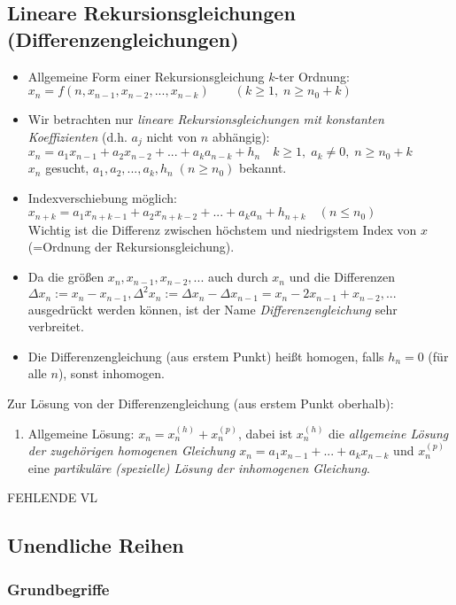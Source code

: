 \subsection{Lineare Rekursionsgleichungen (Differenzengleichungen)}
\begin{itemize}
\item Allgemeine Form einer Rekursionsgleichung $k$-ter Ordnung:\\
$x_n=f(n,x_{n-1},x_{n-2},...,x_{n-k}) \qquad (k \geq 1,\; n\geq n_0+k)$
\item Wir betrachten nur \emph{lineare Rekursionsgleichungen mit konstanten Koeffizienten} (d.h. $a_j$ nicht von $n$ abhängig):\\
$\boxed{x_n=a_1 x_{n-1}+a_2 x_{n-2}+...+a_k a_{n-k}+h_n}\quad k\geq 1, \; a_k \not = 0, \; n\geq n_0 +k$\\
$x_n$ gesucht, $a_1,a_2,...,a_k, h_n \; (n\geq n_0)$ bekannt.
\item Indexverschiebung möglich:\\
$\boxed{x_{n+k}=a_1 x_{n+k-1}+a_2 x_{n+k-2}+...+a_k a_{n}+h_{n+k}}\quad (n\leq n_0)$\\
Wichtig ist die Differenz zwischen höchstem und niedrigstem Index von $x$ (=Ordnung der Rekursionsgleichung).
\item Da die größen $x_n, x_{n-1}, x_{n-2},...$ auch durch $x_n$ und die Differenzen $\Delta x_n:=x_n-x_{n-1}, \Delta^2x_n:=\Delta x_n-\Delta x_{n-1}=x_n-2x_{n-1}+x_{n-2}, ...$ ausgedrückt werden können, ist der Name \emph{Differenzengleichung} sehr verbreitet.
\item Die Differenzengleichung (aus erstem Punkt) heißt homogen, falls $h_n=0$ (für alle $n$), sonst inhomogen.
\end{itemize}
Zur Lösung von der Differenzengleichung (aus erstem Punkt oberhalb):
\begin{enumerate}
\item Allgemeine Lösung: $\boxed{x_n=x_n^{(h)}+x_n^{(p)}}$, dabei ist $x_n^{(h)}$ die \emph{allgemeine Lösung der zugehörigen homogenen Gleichung} $\boxed{x_n=a_1 x_{n-1}+...+a_k x_{n-k}}$ und $x_n^{(p)}$ eine \emph{partikuläre (spezielle) Lösung der inhomogenen Gleichung}.
\end{enumerate}

FEHLENDE VL

\subsection{Unendliche Reihen}
\subsubsection{Grundbegriffe}
